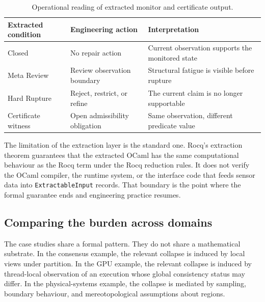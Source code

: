 \documentclass[a4paper,11pt]{article}
\begin{document}
\begin{table}[t]
\centering
\small
\begin{tabular}{p{2.5cm}p{3.2cm}p{5.0cm}}
\hline
Extracted condition & Engineering action & Interpretation \\
\hline
Closed
  & No repair action
  & Current observation supports the monitored state \\[4pt]
Meta Review
  & Review observation boundary
  & Structural fatigue is visible before rupture \\[4pt]
Hard Rupture
  & Reject, restrict, or refine
  & The current claim is no longer supportable \\[4pt]
Certificate witness
  & Open admissibility obligation
  & Same observation, different predicate value \\
\hline
\end{tabular}
\caption{Operational reading of extracted monitor and certificate output.}
\label{tab:engineering-action}
\end{table}

The limitation of the extraction layer is the standard one. Rocq's extraction
theorem guarantees that the extracted OCaml has the same computational
behaviour as the Rocq term under the Rocq reduction rules. It does not verify
the OCaml compiler, the runtime system, or the interface code that feeds
sensor data into \texttt{ExtractableInput} records. That boundary is the point
where the formal guarantee ends and engineering practice resumes.

\label{sec:casestudies}



\subsection{Comparing the burden across domains}
\label{subsec:domain-burden}

The case studies share a formal pattern. They do not share a mathematical
substrate. In the consensus example, the relevant collapse is induced by local
views under partition. In the GPU example, the relevant collapse is induced by
thread-local observation of an execution whose global consistency status may
differ. In the physical-systems example, the collapse is mediated by sampling,
boundary behaviour, and mereotopological assumptions about regions.
\end{document}
